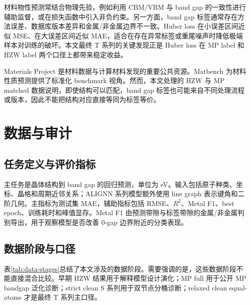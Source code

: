 \documentclass[UTF8,a4paper,11pt]{ctexart}
\newcommand{\rdsq}{R^2}
\begin{document}
材料物性预测常结合物理先验，例如利用 CBM/VBM 与 band gap 的一致性进行辅助监督，或在损失函数中引入非负约束。另一方面，band gap 标签通常存在方法误差、数据库版本差异和金属/非金属边界不一致。Huber loss 在小误差区间近似 MSE、在大误差区间近似 MAE，适合在存在异常标签或重尾噪声时降低极端样本对训练的破坏。本文最终 T 系列的关键发现正是 Huber loss 在 MP label 和 HZW label 两个口径上都带来稳定收益。

Materials Project 是材料数据与计算材料发现的重要公共资源\cite{jain2013mp}。Matbench 为材料性质预测提供了标准化 benchmark 视角\cite{dunn2020matbench}。然而，本文处理的 HZW 与 MP matched 数据说明，即使结构可以匹配，band gap 标签也可能来自不同处理流程或版本，因此不能把结构对应直接等同为标签等价。

\section{数据与审计}

\subsection{任务定义与评价指标}

主任务是晶体结构到 band gap 的回归预测，单位为 eV。输入包括原子种类、坐标、晶格和周期近邻关系；ALIGNN 系列模型额外使用 line graph 表示键角和二阶几何。主指标为测试集 MAE，辅助指标包括 RMSE、$\rdsq$、Metal F1、best epoch、训练耗时和峰值显存。Metal F1 由预测带隙与标签带隙的金属/非金属判别导出，用于观察模型是否改善 0-gap 边界附近的分类表现。

\subsection{数据阶段与口径}

表\ref{tab:data-stages}总结了本文涉及的数据阶段。需要强调的是，这些数据阶段不能直接混合比较。早期 HZW 结果用于解释模型设计演化；MP full 用于公开 MP bandgap 泛化诊断；strict clean S 系列用于双节点分桶诊断；relaxed clean equal-atoms 才是最终 T 系列主口径。
\end{document}
